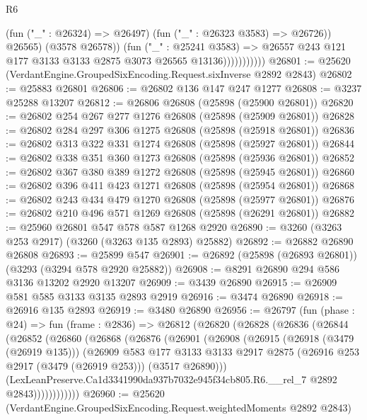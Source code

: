 \begin{lexlean}{R6}
\begin{coremodule}
                              (fun ("_" : @26324) => @26497)
                              (fun ("_" : @26323 @3583) => @26726))
                            @26565)
                          (@3578 @26578))
                        (fun ("_" : @25241 @3583) =>
                        @26557 @243 @121 @177 @3133 @3133 @2875 @3073 @26565 @13136)))))))))))
@26801 := @25620 (VerdantEngine.GroupedSixEncoding.Request.sixInverse @2892 @2843)
@26802 := @25883 @26801
@26806 := @26802 @136 @147 @247 @1277
@26808 := @3237 @25288 @13207
@26812 := @26806 @26808 (@25898 (@25900 @26801))
@26820 := @26802 @254 @267 @277 @1276 @26808 (@25898 (@25909 @26801))
@26828 := @26802 @284 @297 @306 @1275 @26808 (@25898 (@25918 @26801))
@26836 := @26802 @313 @322 @331 @1274 @26808 (@25898 (@25927 @26801))
@26844 := @26802 @338 @351 @360 @1273 @26808 (@25898 (@25936 @26801))
@26852 := @26802 @367 @380 @389 @1272 @26808 (@25898 (@25945 @26801))
@26860 := @26802 @396 @411 @423 @1271 @26808 (@25898 (@25954 @26801))
@26868 := @26802 @243 @434 @479 @1270 @26808 (@25898 (@25977 @26801))
@26876 := @26802 @210 @496 @571 @1269 @26808 (@25898 (@26291 @26801))
@26882 := @25960 @26801 @547 @578 @587 @1268 @2920
@26890 := @3260 (@3263 @253 @2917) (@3260 (@3263 @135 @2893) @25882)
@26892 := @26882 @26890 @26808
@26893 := @25899 @547
@26901 := @26892 (@25898 (@26893 @26801)) (@3293 (@3294 @578 @2920 @25882))
@26908 := @8291 @26890 @294 @586 @3136 @13202 @2920 @13207
@26909 := @3439 @26890
@26915 := @26909 @581 @585 @3133 @3135 @2893 @2919
@26916 := @3474 @26890
@26918 := @26916 @135 @2893
@26919 := @3480 @26890
@26956 := @26797
    (fun (phase : @24) =>
    fun (frame : @2836) =>
    @26812
      (@26820
        (@26828
          (@26836
            (@26844
              (@26852
                (@26860
                  (@26868
                    (@26876
                      (@26901
                        (@26908
                          (@26915
                            (@26918 (@3479 (@26919 @135)))
                            (@26909
                              @583
                              @177
                              @3133
                              @3133
                              @2917
                              @2875
                              (@26916 @253 @2917 (@3479 (@26919 @253)))
                              (@3517 @26890)))
                          (LexLeanPreserve.Ca1d3341990da937b7032e945f34cb805.R6.__rel_7
                            @2892
                            @2843))))))))))))
@26960 := @25620 (VerdantEngine.GroupedSixEncoding.Request.weightedMoments @2892 @2843)

\end{coremodule}
\end{lexlean}
